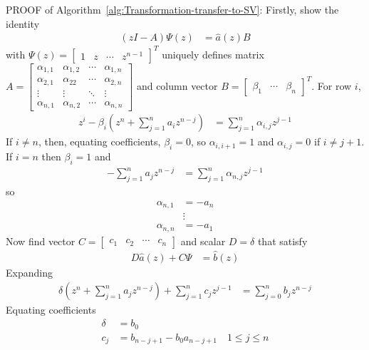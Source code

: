\documentclass[a4paper,twoside,10pt,english]{report}
\begin{document}
\textsc{PROOF} of Algorithm~\ref{alg:Transformation-transfer-to-SV}:
Firstly, show the identity
\begin{align*}
\left(zI-A\right)\Psi\left(z\right) &= \hat{a}\left(z\right)B
\end{align*}
with $\Psi\left(z\right)=\left[\begin{array}{cccc}
1 & z & \cdots & z^{n-1}\end{array}\right]^{T}$ uniquely defines matrix $A=\left[\begin{array}{cccc}
\alpha_{1,1} & \alpha_{1,2} & \cdots & \alpha_{1,n}\\
\alpha_{2,1} & \alpha_{22} & \cdots & \alpha_{2,n}\\
\vdots & \vdots & \ddots & \vdots\\
\alpha_{n,1} & \alpha_{n,2} & \cdots & \alpha_{n,n}
\end{array}\right]$ and column vector $B=\left[\begin{array}{ccc}
\beta_{1} & \cdots & \beta_{n}\end{array}\right]^{T}$. For row $i$,
\begin{align*}
z^{i}-\beta_{i}\left(z^{n}+\sum_{j=1}^{n}a_{i}z^{n-j}\right) &= \sum_{j=1}^{n}\alpha_{i,j}z^{j-1}
\end{align*}
If $i\neq n$, then, equating coefficients, $\beta_{i}=0$, so $\alpha_{i,i+1}=1$
and $\alpha_{i,j}=0$ if $i\neq j+1$. If $i=n$ then $\beta_{i}=1$
and
\begin{align*}
-\sum_{j=1}^{n}a_{j}z^{n-j} &= \sum_{j=1}^{n}\alpha_{n,j}z^{j-1}
\end{align*}
so
\begin{align*}
\alpha_{n,1} &= -a_{n}\\
 & \vdots\\
\alpha_{n,n} &= -a_{1}
\end{align*}
Now find vector $C=\left[\begin{array}{cccc}
c_{1} & c_{2} & \cdots & c_{n}\end{array}\right]$ and scalar $D=\delta$ that satisfy
\begin{align*}
D\hat{a}\left(z\right)+C\Psi &= \hat{b}\left(z\right)
\end{align*}
Expanding
\begin{align*}
\delta\left(z^{n}+\sum_{j=1}^{n}a_{j}z^{n-j}\right)+\sum_{j=1}^{n}c_{j}z^{j-1} &= \sum_{j=0}^{n}b_{j}z^{n-j}
\end{align*}
Equating coefficients
\begin{align*}
\delta &= b_{0}\\
c_{j} &= b_{n-j+1}-b_{0}a_{n-j+1}\quad1\leq j\leq n
\end{align*}
\end{document}
